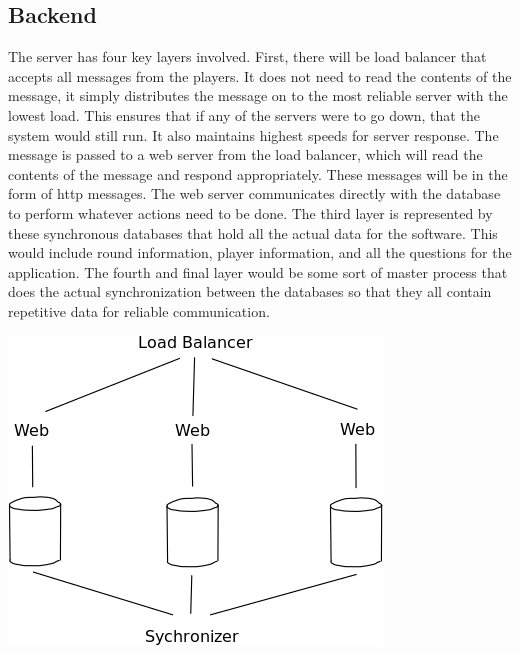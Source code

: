 \documentclass{dependencies/acm_proc_article-sp}
\begin{document}
\subsection{Backend}
The server has four key layers involved.
First, there will be load balancer that accepts all messages from the players.
It does not need to read the contents of the message, it simply distributes the message on to the most reliable server with the lowest load.
This ensures that if any of the servers were to go down, that the system would still run.
It also maintains highest speeds for server response.
The message is passed to a web server from the load balancer, which will read the contents of the message and respond appropriately.
These messages will be in the form of http messages.
The web server communicates directly with the database to perform whatever actions need to be done.
The third layer is represented by these synchronous databases that hold all the actual data for the software.
This would include round information, player information, and all the questions for the application.
The fourth and final layer would be some sort of master process that does the actual synchronization between the databases so that they all contain repetitive data for reliable communication.

\begin{center}
  \includegraphics[scale=0.3]{design-pictures/database.png}
\end{center}

\newpage
%
%
%
\balancecolumns
\end{document}
